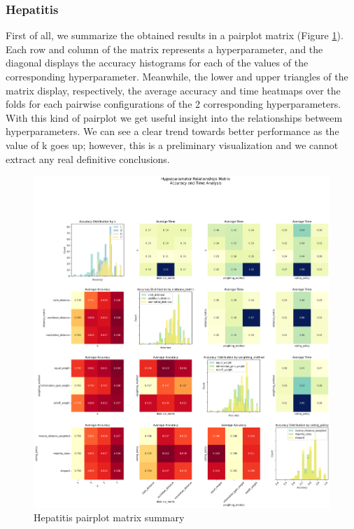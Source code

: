 \subsubsection{Hepatitis}
First of all, we summarize the obtained results in a pairplot matrix (Figure \ref{fig:hep:pairplot}). Each row and column of the matrix represents a hyperparameter, and the diagonal displays the accuracy histograms for each of the values of the corresponding hyperparameter. Meanwhile, the lower and upper triangles of the matrix display, respectively, the average accuracy and time heatmaps over the folds for each pairwise configurations of the 2 corresponding hyperparameters. With this kind of pairplot we get useful insight into the relationships betweem hyperparameters. We can see a clear trend towards better performance as the value of k goes up; however, this is a preliminary visualization and we cannot extract any real definitive conclusions.
\begin{figure}[t]
    \centering
    \includegraphics[width=\textwidth]{figures/knn/hepatitis/hyperparameter_pairplot_matrix.png}
    \caption{Hepatitis pairplot matrix summary}
    \label{fig:hep:pairplot}
\end{figure}

